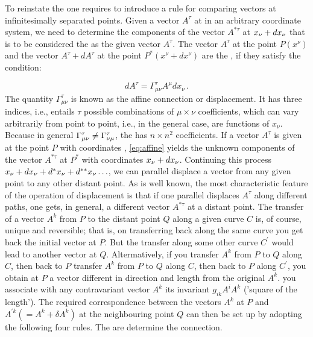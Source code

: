 \documentclass[draft]{article}
\begin{document}
To reinstate the  one requires to introduce a rule for comparing vectors at infinitesimally separated points. Given a vector $A^\tau$ at \xn in an arbitrary coordinate system, we need to determine the components of the vector $A^{\ast\tau}$ at $x_{\nu}+dx_{\nu}$ that is to be considered the  as the given vector $A^\tau$. The vector $A^{\tau}$ at the point $P\left(x^{\nu}\right)$ and the vector $A^{\tau}+d A^{\tau}$ at the point $P^{\ast}\left(x^{\nu}+d x^{\nu}\right)$ are the , if they satisfy the condition:

\begin{equation}\label{eq:affine}
dA^\tau = \Gamma^\tau_{\mu\nu}A^{\mu} dx_\nu\,.
\end{equation}
%
The quantity $\Gamma^\tau_{\mu\nu}$ is known as the affine connection or displacement. It has three indices, i.e., entails $\tau$ possible combinations of $\mu \times \nu$ coefficients, which can vary arbitrarily from point to point, i.e., in the general case, are functions of $x_\nu$. Because in general $\Gamma^\tau_{\mu\nu} \neq \Gamma^\tau_{\nu\mu}$, the \Gtmn has $n \times n^2$ coefficients. If a vector $A^\tau$ is given at the point $P$ with coordinates \xn, \cref{eq:affine} yields the unknown components of the vector $A^{\ast\tau}$ at $P^*$ with coordinates $x_{\nu}+dx_\nu$. Continuing this process $
x_{\nu}+dx_{\nu}+d^{\ast} x_{\nu}+d^{\ast \ast} x_{\nu} \ldots$, we can parallel displace a vector from any given point to any other distant point. As is well known, the most characteristic feature of the operation of displacement is that if one parallel displaces $A^\tau$ along different paths, one gets, in general, a different vector $A^{\ast \tau}$ at a distant point. The transfer of a vector $A^{k}$ from $P$ to the distant point $Q$ along a given curve $C$ is, of course, unique and reversible; that is, on transferring back along the same curve you get back the initial vector at $P$. But the transfer along some other curve $C^{\prime}$ would lead to another vector at $Q$. Altermatively, if you transfer $A^{k}$ from $P$ to $Q$ along $C$, then back to $P$ transfer $A^{k}$ from $P$ to $Q$ along $C$, then back to $P$ along $C^{\prime}$, you obtain at $P$ a vector different in direction and length from the original $A^{k}$. you associate with any contravariant vector $A^{k}$ its invariant $g_{i k} A^{i} A^{k}$ ('square of the length'). The required correspondence between the vectors $A^{k}$ at $P$ and $A^{\prime k}\left(=A^{k}+\delta A^{k}\right)$ at the neighbouring point $Q$ can then be set up by adopting the following four rules. The \gmn are determine the connection.
\end{document}
